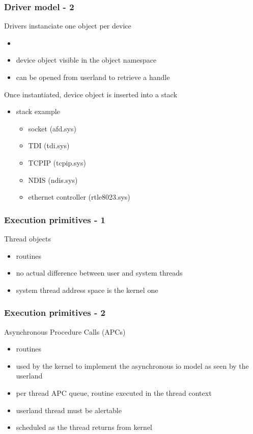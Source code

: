 
\begin{frame}
 \frametitle{Driver model - 2}

 Drivers instanciate one object per device

 \begin{itemize}
  \item {}
  \item device object visible in the object namespace
  \item can be opened from userland to retrieve a handle
 \end{itemize}

 Once instantiated, device object is inserted into a stack

 \begin{itemize}
  \item stack example
   \begin{itemize}
    \item socket (afd.sys)
    \item TDI (tdi.sys)
    \item TCPIP (tcpip.sys)
    \item NDIS (ndis.sys)
    \item ethernet controller (rtle8023.sys)
   \end{itemize}

 \end{itemize}

\end{frame}


\begin{frame}
 \frametitle{Execution primitives - 1}

 Thread objects

 \begin{itemize}
  \item {} routines
  \item no actual difference between user and system threads
  \item system thread address space is the kernel one
 \end{itemize}

\end{frame}


\begin{frame}
 \frametitle{Execution primitives - 2}

 Asynchronous Procedure Calls (APCs)

 \begin{itemize}
  \item {} routines
  \item used by the kernel to implement the asynchronous io model as seen by the userland
  \item per thread APC queue, routine executed in the thread context
  \item userland thread must be alertable
  \item scheduled as the thread returns from kernel
 \end{itemize}

\end{frame}

